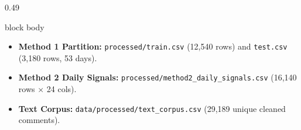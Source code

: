 \documentclass[aspectratio=169, 10pt]{beamer}
\newenvironment{card}[1][]{%
        \begin{beamercolorbox}[rounded=true,shadow=false,wd=\linewidth,sep=3.5pt,#1]{block body}%
        \fontsize{7.8pt}{9.8pt}\selectfont%
    }{%
        \end{beamercolorbox}%
    }
\begin{document}
\begin{frame}[t]
\begin{columns}[T]
\begin{column}{0.49\textwidth}
\begin{card}
\begin{itemize}
                        \item \textbf{Method 1 Partition:} \texttt{processed/train.csv} (12,540 rows) and \texttt{test.csv} (3,180 rows, 53 days).                                                     
                        \item \textbf{Method 2 Daily Signals:} \texttt{processed/method2\_daily\_signals.csv} (16,140 rows $\times$ 24 cols).                                                          
                        \item \textbf{Text Corpus:} \texttt{data/processed/text\_corpus.csv} (29,189 unique cleaned comments).                                                                         
                    \end{itemize}                                                                                                                                                                      
                \end{card}                                                                                                                                                                             
            \end{column}                                                                                                                                                                               
        \end{columns}                                                                                                                                                                                  
    \end{frame}                                                                                                                                                                                        
                                                                                                                                                                                                       
\end{document}
